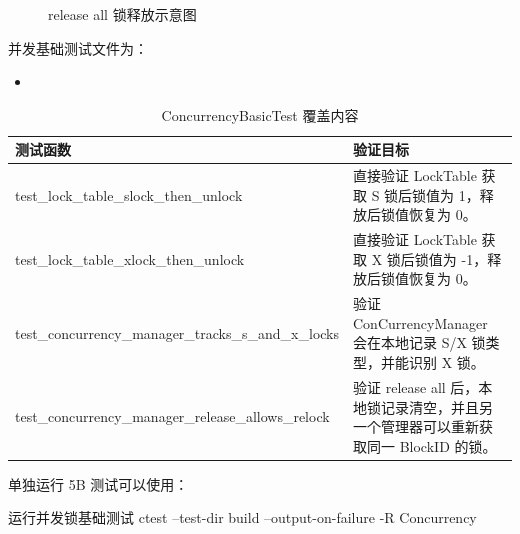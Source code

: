 \begin{figure}[htbp]
  \centering
  \caption{release all 锁释放示意图}
  \label{fig:tx-lock-release}
\end{figure}

并发基础测试文件为：
\begin{itemize}
  \item {}
\end{itemize}

\begin{table}[htbp]
  \centering
  \caption{ConcurrencyBasicTest 覆盖内容}
  \label{tab:tx-concurrency-tests}
  \begin{tabularx}{\textwidth}{>{\ttfamily}l Y}
    \toprule
    测试函数 & 验证目标 \\
    \midrule
    test\_lock\_table\_slock\_then\_unlock & 直接验证 LockTable 获取 S 锁后锁值为 1，释放后锁值恢复为 0。\\
    test\_lock\_table\_xlock\_then\_unlock & 直接验证 LockTable 获取 X 锁后锁值为 -1，释放后锁值恢复为 0。\\
    test\_concurrency\_manager\_tracks\_s\_and\_x\_locks & 验证 ConCurrencyManager 会在本地记录 S/X 锁类型，并能识别 X 锁。\\
    test\_concurrency\_manager\_release\_allows\_relock & 验证 release all 后，本地锁记录清空，并且另一个管理器可以重新获取同一 BlockID 的锁。\\
    \bottomrule
  \end{tabularx}
\end{table}

单独运行 5B 测试可以使用：

\begin{dbcode}[listing options={language=bash}]{运行并发锁基础测试}
ctest --test-dir build --output-on-failure -R Concurrency
\end{dbcode}

